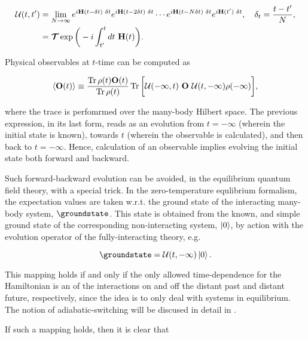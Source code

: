 \begin{equation} 
\begin{split}
    \mathcal{U}(t,t') &= \lim_{N \rightarrow \infty} e^{i {\bf H}(t- \delta t) \textnormal{ } \delta t}  e^{i {\bf H}(t- 2 \delta t) \textnormal{ } \delta t} \cdots e^{i {\bf H}(t- N\delta t) \textnormal{ } \delta t}  e^{i {\bf H}(t') \textnormal{ } \delta t}, \quad \delta_t = \frac{t-t'}{N}, \\
    &= \bm{\mathcal{T}} \exp 
    \bigg(
        -i \int_{t'}^{t} dt \textnormal{ } {\bf H}(t)
    \bigg).
\end{split}
\end{equation}

Physical observables at $t$-time can be computed as 

\begin{equation}
    \langle {\bf O}(t) \rangle \equiv \frac{\Tr \rho(t) {\bf O}(t)}{\Tr \rho(t)} \Tr \bigg[ 
        \mathcal{U}(-\infty, t) \textnormal{ } {\bf O} \textnormal{ } \mathcal{U}(t, -\infty) \rho(-\infty)
    \bigg],
\end{equation}

where the trace is perfomrmed over the many-body Hilbert space. 
The previous expression, in its last form, reads as an evolution from $t = - \infty$ (wherein the initial state is known), towards $t$ (wherein the observable is calculated), and then back to $t = - \infty$. 
Hence, calculation of an observable implies evolving the initial state both forward and backward. \medbreak

Such forward-backward evolution can be avoided, in the equilibrium quantum field theory, with a special trick. 
In the zero-temperature equlibrium formalism, the expectation values are taken w.r.t. the ground state of the interacting many-body system, $\groundstate$. 
This state is obtained from the known, and simple ground state of the corresponding non-interacting system, $\ket{0}$, by action with the evolution operator of the fully-interacting theory, e.g.

$$
    \groundstate = \mathcal{U}(t, -\infty) \ket{0}. 
$$

This mapping holds if and only if the only allowed time-dependence for the Hamiltonian is an  of the interactions on and off the distant past and distant future, respectively, since the idea is to only deal with systems in equilibrium. The notion of adiabatic-switching will be discused in detail in . 

If such a mapping holds, then it is clear that 

